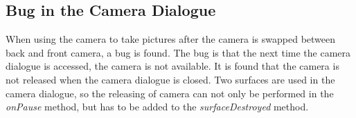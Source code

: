 \subsection*{Bug in the Camera Dialogue}
When using the camera to take pictures after the camera is swapped between back and front camera, a bug is found.
The bug is that the next time the camera dialogue is accessed, the camera is not available.
It is found that the camera is not released when the camera dialogue is closed.
Two surfaces are used in the camera dialogue, so the releasing of camera can not only be performed in the \textit{onPause} method, but has to be added to the \textit{surfaceDestroyed} method.